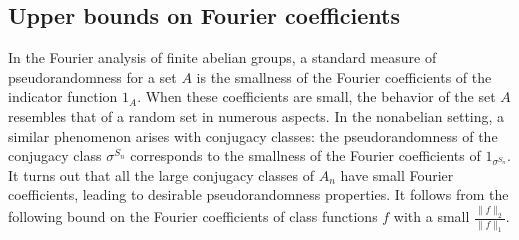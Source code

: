 \documentclass[11pt, letterpaper]{amsart}
\begin{document}
\subsection{Upper bounds on Fourier coefficients}
In the Fourier analysis of finite abelian groups, a standard measure of pseudorandomness for a set $A$ is the smallness of the Fourier coefficients of the indicator function $1_A$. When these coefficients are small, the behavior of the set $A$ resembles that of a random set in numerous aspects.
In the nonabelian setting, a similar phenomenon arises with conjugacy classes: the pseudorandomness of the conjugacy class $\sigma^{S_n}$ corresponds to the smallness of the Fourier coefficients of $1_{\sigma^{S_n}}$. 
It turns out that all the large conjugacy classes of $A_n$ have small Fourier coefficients, leading to desirable pseudorandomness properties. It follows from the following bound on the Fourier coefficients of class functions $f$ with a small $\frac{\|f\|_2}{\|f\|_1}$.
\end{document}
